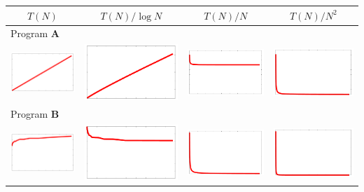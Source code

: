 \documentclass[a4paper]{article}
\begin{document}
\begin{center}
  \begin{tabular}{cccc}
    \toprule
    $T(N)$ & $T(N) / \log N$ & $T(N) / N$ & $T(N) / N^2$ \\
    \midrule
    \multicolumn{4}{l}{Program \textbf{A}} \\
    \quad
    \includegraphics[width=0.23\columnwidth]{flin1.pdf} &
    \includegraphics[width=0.23\columnwidth]{flin1-log.pdf} &
    \includegraphics[width=0.23\columnwidth]{flin1-n.pdf} &
    \includegraphics[width=0.23\columnwidth]{flin1-n2.pdf} \\
    \midrule
    \multicolumn{4}{l}{Program \textbf{B}} \\
    \quad
    \includegraphics[width=0.23\columnwidth]{flog1.pdf} &
    \includegraphics[width=0.23\columnwidth]{flog1-log.pdf} &
    \includegraphics[width=0.23\columnwidth]{flog1-n.pdf} &
    \includegraphics[width=0.23\columnwidth]{flog1-n2.pdf} \\

\end{tabular}
\end{center}
\end{document}
